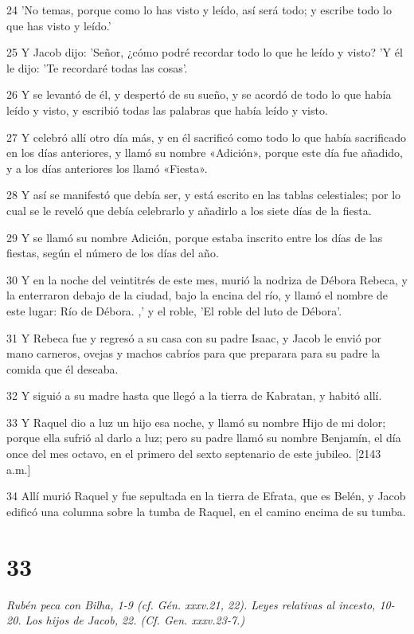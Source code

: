 \par 24 'No temas, porque como lo has visto y leído, así será todo; y escribe todo lo que has visto y leído.'
\par 25 Y Jacob dijo: 'Señor, ¿cómo podré recordar todo lo que he leído y visto? 'Y él le dijo: 'Te recordaré todas las cosas'.
\par 26 Y se levantó de él, y despertó de su sueño, y se acordó de todo lo que había leído y visto, y escribió todas las palabras que había leído y visto.
\par 27 Y celebró allí otro día más, y en él sacrificó como todo lo que había sacrificado en los días anteriores, y llamó su nombre «Adición», porque este día fue añadido, y a los días anteriores los llamó «Fiesta».
\par 28 Y así se manifestó que debía ser, y está escrito en las tablas celestiales; por lo cual se le reveló que debía celebrarlo y añadirlo a los siete días de la fiesta.
\par 29 Y se llamó su nombre Adición, porque estaba inscrito entre los días de las fiestas, según el número de los días del año.
\par 30 Y en la noche del veintitrés de este mes, murió la nodriza de Débora Rebeca, y la enterraron debajo de la ciudad, bajo la encina del río, y llamó el nombre de este lugar: Río de Débora. ,' y el roble, 'El roble del luto de Débora'.
\par 31 Y Rebeca fue y regresó a su casa con su padre Isaac, y Jacob le envió por mano carneros, ovejas y machos cabríos para que preparara para su padre la comida que él deseaba.
\par 32 Y siguió a su madre hasta que llegó a la tierra de Kabratan, y habitó allí.
\par 33 Y Raquel dio a luz un hijo esa noche, y llamó su nombre Hijo de mi dolor; porque ella sufrió al darlo a luz; pero su padre llamó su nombre Benjamín, el día once del mes octavo, en el primero del sexto septenario de este jubileo. [2143 a.m.]
\par 34 Allí murió Raquel y fue sepultada en la tierra de Efrata, que es Belén, y Jacob edificó una columna sobre la tumba de Raquel, en el camino encima de su tumba.

\chapter{33}

\par \textit{Rubén peca con Bilha, 1-9 (cf. Gén. xxxv.21, 22). Leyes relativas al incesto, 10-20. Los hijos de Jacob, 22. (Cf. Gen. xxxv.23-7.)}


